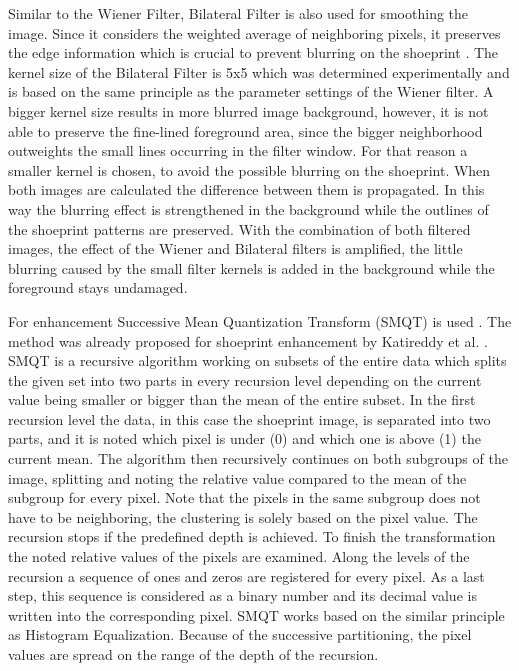 \documentclass[draft,final]{vutinfth} %
\begin{document}
Similar to the Wiener Filter, Bilateral Filter is also used for smoothing the image.
Since it considers the weighted average of neighboring pixels, it preserves the edge information which is crucial to prevent blurring on the shoeprint \cite{elad2002origin}. 
The kernel size of the Bilateral Filter is 5x5 which was determined experimentally and is based on the same principle as the parameter settings of the Wiener filter.
A bigger kernel size results in more blurred image background, however, it is not able to preserve the fine-lined foreground area, since the bigger neighborhood outweights the small lines occurring in the filter window.
For that reason a smaller kernel is chosen, to avoid the possible blurring on the shoeprint.
When both images are calculated the difference between them is propagated.
In this way the blurring effect is strengthened in the background while the outlines of the shoeprint patterns are preserved.
With the combination of both filtered images, the effect of the Wiener and Bilateral filters is amplified, the little blurring caused by the small filter kernels is added in the background while the foreground stays undamaged.
\par
For enhancement Successive Mean Quantization Transform (SMQT) is used \cite{nilsson2013smqt}.
The method was already proposed for shoeprint enhancement by Katireddy et al. \cite{katireddy2017novel}.
SMQT is a recursive algorithm working on subsets of the entire data which splits the given set into two parts in every recursion level depending on the current value being smaller or bigger than the mean of the entire subset.
In the first recursion level the data, in this case the shoeprint image, is separated into two parts, and it is noted which pixel is under (0) and which one is above (1) the current mean.
The algorithm then recursively continues on both subgroups of the image, splitting and noting the relative value compared to the mean of the subgroup  for every pixel.
Note that the pixels in the same subgroup does not have to be neighboring, the clustering is solely based on the pixel value.
The recursion stops if the predefined depth is achieved.
To finish the transformation the noted relative values of the pixels are examined.
Along the levels of the recursion a sequence of ones and zeros are registered for every pixel.
As a last step, this sequence is considered as a binary number and its decimal value is written into the corresponding pixel.
SMQT works based on the similar principle as Histogram Equalization.
Because of the successive partitioning, the pixel values are spread on the range of the depth of the recursion.
\end{document}

